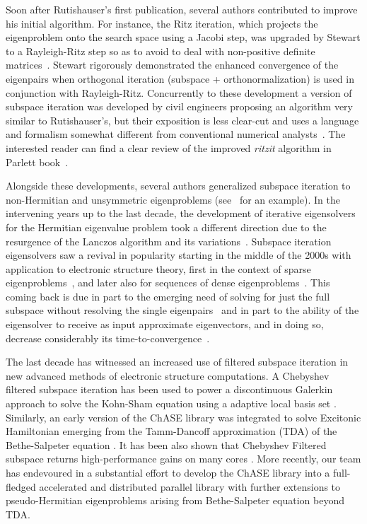 Soon after Rutishauser's first publication, several authors
contributed to improve his initial algorithm. For instance, the Ritz
iteration, which projects the eigenproblem onto the search space using
a Jacobi step, was upgraded by Stewart to a Rayleigh-Ritz step so as
to avoid to deal with non-positive definite
matrices~\cite{Stewart:1969cq}. Stewart rigorously
demonstrated the enhanced convergence of the eigenpairs when
orthogonal iteration (subspace + orthonormalization) is used in
conjunction with Rayleigh-Ritz. Concurrently to these development a
version of subspace iteration was developed by civil engineers
proposing an algorithm very similar to Rutishauser's, but their
exposition is less clear-cut and uses a language and formalism
somewhat different from conventional numerical
analysts~\cite{Clint:1970wz}. The interested reader can find a clear
review of the improved {\it ritzit} algorithm in Parlett
book~\cite{Parlett:1998tv}.

Alongside these developments, several authors generalized subspace
iteration to non-Hermitian and unsymmetric eigenproblems
(see~\cite{Stewart:1976vaa} for an example). In the intervening years
up to the last decade, the development of iterative eigensolvers for
the Hermitian eigenvalue problem took a different direction due to the
resurgence of the Lanczos algorithm and its
variations~\cite{Cullum:1974fe, Parlett:1979vf, Cullum:1985wj,
  Wu:2000vq, Davidson:1975wf, Crouzeix:1994wh, Ruhe:1984ep,
  Stewart:2002tw}. Subspace iteration eigensolvers saw a revival in
popularity starting in the middle of the 2000s with application to
electronic structure theory, first in the context of sparse
eigenproblems~\cite{Zhou:2006ek, Zhou:2014fe}, and later also for
sequences of dense eigenproblems~\cite{Berljafa:2014jv, Levitt:2015wc}.
This coming back is due in part to the emerging need of solving for
just the full subspace without resolving the single
eigenpairs~\cite{Zhou:2006ek} and in part to the ability of the
eigensolver to receive as input approximate eigenvectors, and in doing
so, decrease considerably its time-to-convergence~\cite{DiNapoli:2012uy}.

The last decade has witnessed an increased use of filtered subspace iteration in new advanced methods of electronic structure computations. A Chebyshev filtered subspace iteration has been used to power a discontinuous Galerkin approach to solve the Kohn-Sham equation using a adaptive local basis set \cite{Banerjee2016, Banerjee2018}. Similarly, an early version of the ChASE library \cite{Winkelmann2019chase} was integrated to solve Excitonic Hamiltonian emerging from the Tamm-Dancoff approximation (TDA) of the Bethe-Salpeter equation \cite{zhang2021solving}. It has been also shown that Chebyshev Filtered subspace returns high-performance gains on many cores \cite{Kreutzer2018}. More recently, our team has endevoured in a substantial effort to develop the ChASE library into a full-fledged accelerated and distributed parallel library \cite{Wu2022chase,Wu2023chase} with further extensions to pseudo-Hermitian eigenproblems \cite{dinapoli2026chase} arising from Bethe-Salpeter equation beyond TDA.      


